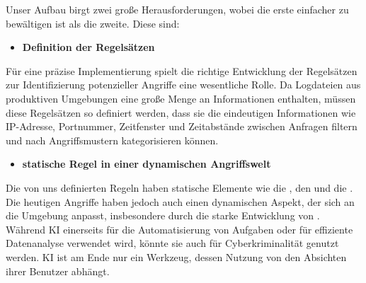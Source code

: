 
Unser Aufbau birgt zwei große Herausforderungen, wobei die erste einfacher zu bewältigen ist als die zweite. Diese sind:

\begin{itemize}[noitemsep]
    \item \textbf{Definition der Regelsätzen}
\end{itemize}


Für eine präzise Implementierung spielt die richtige Entwicklung der Regelsätzen zur Identifizierung potenzieller Angriffe eine wesentliche Rolle. Da Logdateien aus produktiven Umgebungen eine große Menge an Informationen enthalten, müssen diese Regelsätzen so definiert werden, dass sie die eindeutigen Informationen wie IP-Adresse, Portnummer, Zeitfenster und Zeitabstände zwischen Anfragen filtern und nach Angriffsmustern kategorisieren können.

\begin{itemize}[noitemsep]
    \item \textbf{statische Regel in einer dynamischen Angriffswelt}
\end{itemize}

Die von uns definierten Regeln haben statische Elemente wie die , den  und die . Die heutigen Angriffe haben jedoch auch einen dynamischen Aspekt, der sich an die Umgebung anpasst, insbesondere durch die starke Entwicklung von . Während \gls{KI} einerseits für die Automatisierung von Aufgaben oder für effiziente Datenanalyse verwendet wird, könnte sie auch für Cyberkriminalität genutzt werden. \gls{KI} ist am Ende nur ein Werkzeug, dessen Nutzung von den Absichten ihrer Benutzer abhängt.


